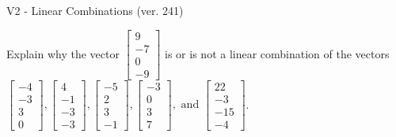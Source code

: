 \begin{exercise}
  \begin{exerciseTitle}V2 - Linear Combinations (ver. 241)\end{exerciseTitle}
  \begin{exerciseStatement}
    Explain why the vector \(\left[\begin{array}{c}
9 \\
-7 \\
0 \\
-9
\end{array}\right]\)  is or is not a linear 
	combination of the vectors \(\left[\begin{array}{c}
-4 \\
-3 \\
3 \\
0
\end{array}\right] , \left[\begin{array}{c}
4 \\
-1 \\
-3 \\
-3
\end{array}\right] , \left[\begin{array}{c}
-5 \\
2 \\
3 \\
-1
\end{array}\right] , \left[\begin{array}{c}
-3 \\
0 \\
3 \\
7
\end{array}\right] , \text{ and } \left[\begin{array}{c}
22 \\
-3 \\
-15 \\
-4
\end{array}\right]\).
	



\end{exerciseStatement}
\end{exercise}
